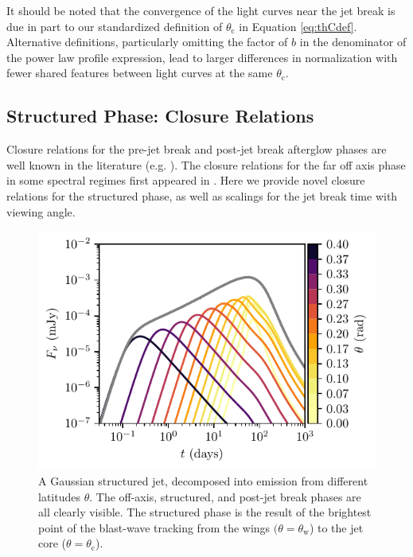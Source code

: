 \documentclass[twocolumn]{aastex62}
\newcommand{\thW}{\ensuremath{\theta_{\mathrm{w}}}}
\newcommand{\thC}{\ensuremath{\theta_{\mathrm{c}}}}
\begin{document}
It should be noted that the convergence of the light curves near the jet break is due in part to our standardized definition of $\thC$ in Equation \eqref{eq:thCdef}.  Alternative definitions, particularly omitting the factor of $b$ in the denominator of the power law profile expression, lead to larger differences in normalization with fewer shared features between light curves at the same $\thC$.  

\subsection{Structured Phase: Closure Relations}\label{subsec:structure}

Closure relations for the pre-jet break and post-jet break afterglow phases are well known in the literature (e.g. \citet{Granot:2002aa, Rhoads:1999aa}).  The closure relations for the far off axis phase in some spectral regimes first appeared in \citet{Salmonson:2003aa}.  Here we provide novel closure relations for the structured phase, as well as scalings for the jet break time with viewing angle.

\begin{figure}
	\includegraphics[width=\columnwidth]{figs/lc_decomp.pdf}
	\caption{A Gaussian structured jet, decomposed into emission from different latitudes $\theta$.  The off-axis, structured, and post-jet break phases are all clearly visible.  The structured phase is the result of the brightest point of the blast-wave tracking from the wings $(\theta =\thW$) to the jet core ($\theta=\thC$). \label{fig:decomp}}
\end{figure}
\end{document}
